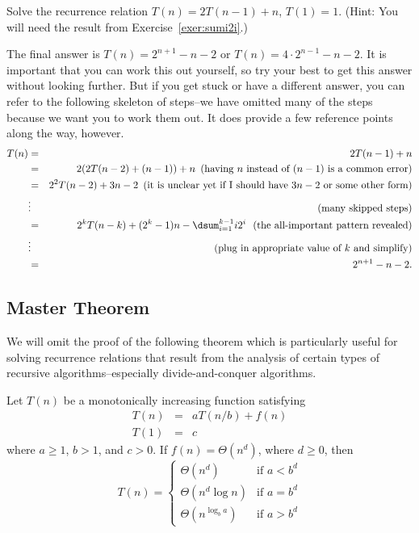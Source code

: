 \begin{exer}
Solve the recurrence relation $T(n)=2T(n-1)+n$, $T(1)=1$.
(Hint:  You will need the result from Exercise~\ref{exer:sumi2i}.)
\vspace*{7.5in}
\begin{answer}
The final answer is $T(n)=2^{n+1}-n-2$ or $T(n)=4\cdot2^{n-1}-n-2$.
It is important that you can work this out yourself, so try your best to get this
answer without looking further.  But if you get stuck or have a different answer,
you can refer to the following skeleton of steps--we have omitted many of the steps
because we want you to work them out.  It does provide a few reference points
along the way, however.
\begin{eqnarray*}
T(n)&=&2T(n-1)+n\\
&=&2(2T(n-2)+(n-1))+n\, \, \, \mbox{(having $n$ instead of $(n-1)$ is a common error)}\\
&=&2^2T(n-2)+3n-2\, \, \, \mbox{(it is unclear yet if I should have $3n-2$ or some other form)}\\
&\vdots& \, \, \, \, \, \, \mbox{(many skipped steps)}\\
&=&2^kT(n-k)+(2^k-1)n-\dsum_{i=1}^{k-1}i2^i\, \, \, \, \mbox{(the all-important pattern revealed)}\\
&\vdots& \, \, \, \, \, \, \mbox{(plug in appropriate value of $k$ and simplify)}\\
&=&2^{n+1}-n-2.
\end{eqnarray*}
\end{answer}
\end{exer}

\newpage

\subsection{Master Theorem} 
We will omit the proof of the following theorem which is particularly
useful for solving recurrence relations that result from the analysis of
certain types of recursive algorithms--especially divide-and-conquer algorithms.

\begin{thm}
Let $T(n)$ be a monotonically increasing function satisfying 
\begin{eqnarray*}
T(n)&=&aT(n/b)+f(n)\\
T(1)&=&c
\end{eqnarray*}
where $a\geq 1$, $b>1$, and $c>0$.
If $f(n)=\Theta(n^d)$, where $d\geq 0$, then
$$T(n)=\left\{
\begin{array}{ll}
\Theta(n^d)&\text{if } a<b^d\\
\Theta(n^d\log n)&\text{if } a=b^d\\
\Theta(n^{\log_b{a}})&\text{if } a>b^d
\end{array}
\right.$$
\end{thm}

